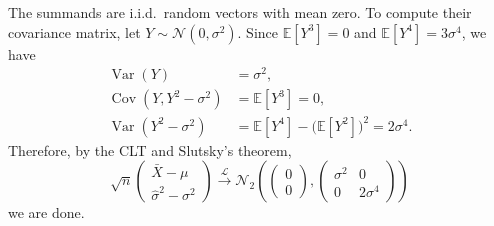 \documentclass[lang=en,11pt,a4paper,citestyle=authoryear,nobib=true]{elegantpaper}
\begin{document}
The summands are i.i.d.\ random vectors with mean zero.
To compute their covariance matrix, let $Y\sim\mathcal N(0,\sigma^2)$.
Since $\mathbb E[Y^3]=0$ and $\mathbb E[Y^4]=3\sigma^4$, we have
\[
\begin{aligned}
\operatorname{Var}(Y) &= \sigma^2,\\
\operatorname{Cov}(Y,Y^2-\sigma^2) &= \mathbb E[Y^3] = 0,\\
\operatorname{Var}(Y^2-\sigma^2)
&= \mathbb E[Y^4] - \bigl(\mathbb E[Y^2]\bigr)^2
= 2\sigma^4.
\end{aligned}
\]
Therefore, by the CLT and Slutsky's theorem,
\[
\sqrt n
\begin{pmatrix}
\bar X-\mu\\
\hat{\sigma}^2-\sigma^2
\end{pmatrix}
\xrightarrow{\mathcal L}
\mathcal N_2\!\left(
\begin{pmatrix}0\\0\end{pmatrix},
\begin{pmatrix}
\sigma^2 & 0\\
0 & 2\sigma^4
\end{pmatrix}
\right)
\]
we are done.
\end{document}
